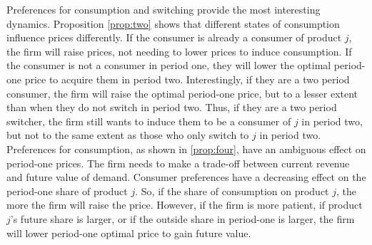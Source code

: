 Preferences for consumption and switching provide the most interesting dynamics.
Proposition \ref{prop:two} shows that different states of consumption influence
prices differently. If the consumer is already a consumer of product $j$, the
firm will raise prices, not needing to lower prices to induce consumption. If
the consumer is not a consumer in period one, they will lower the optimal period-one price to
acquire them in period two. Interestingly, if they are a two period consumer, the firm will raise the optimal period-one price, but to a lesser extent than when they do not switch in period two. Thus, if they are a two period switcher, the firm still wants to induce them to be a consumer of $j$ in period two, but not to the same extent as those who only switch to $j$ in period two. Preferences for consumption, as shown in \ref{prop:four}, have an ambiguous effect on period-one prices. The firm needs to make a trade-off between current revenue and future value of demand. Consumer preferences have a decreasing effect on the period-one share of product $j$. So, if the share of consumption on product $j$, the more the firm will raise the price. However, if the firm is more patient, if product $j$'s future share is larger, or if the outside share in period-one is larger, the firm will lower period-one optimal price to gain future value.

